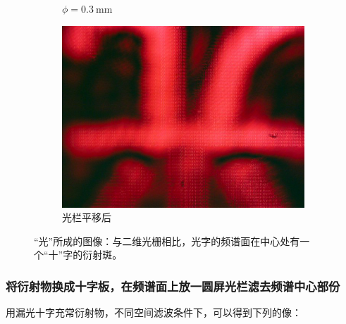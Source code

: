 \documentclass[a4paper]{article}
\begin{document}
\begin{figure}[H]
\begin{subfigure}[t]{0.3\textwidth}
        \caption{$\phi=\SI{0.3}{\mm}$}
        \label{fig6-3}
    \end{subfigure}
    \begin{subfigure}[t]{0.3\textwidth}
        \centering
        \includegraphics[width=\textwidth]{img2-done/5-4-03mm.JPG}
        \caption{光栏平移后}
        \label{fig6-4}
    \end{subfigure}
    \captionsetup{justification=centering,subrefformat=parens,margin=2cm}
    \caption{“光”所成的图像：与二维光栅相比，光字的频谱面在中心处有一个“十”字的衍射斑。}
\end{figure}


\subsubsection{将衍射物换成十字板，在频谱面上放一圆屏光栏滤去频谱中心部份}

\hspace{2em} 用漏光十字充常衍射物，不同空间滤波条件下，可以得到下列的像： \par
\end{document}
